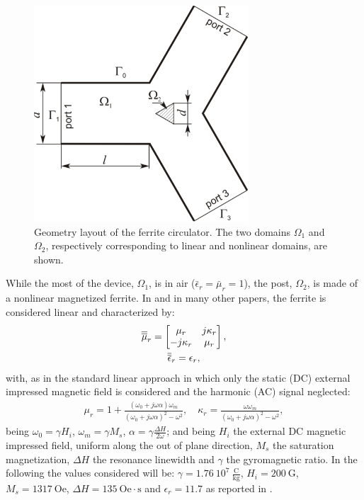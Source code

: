 \begin{figure}[!ht]
\centering
\includegraphics[width=8cm]{Koshiba}
\caption{Geometry layout of the ferrite circulator. The two domains $\Omega_1$ and $\Omega_2$, respectively corresponding to linear and nonlinear domains, are shown.}
\label{fig:Koshiba}
\end{figure}
 
While the most of the device, $\Omega_1$, is in air ($\bar{\epsilon}_r = \bar{\mu}_r = 1$), the post, $\Omega_2$, is made of a nonlinear magnetized ferrite. In \cite{koshiba1986finite} and in many other papers, the ferrite is considered linear and characterized by: 
\begin{gather}
\label{eq:ferrite}
\overline{\overline{\mu}}_r = 
\begin{bmatrix}
\mu_r& j\kappa_r\\
-j\kappa_r& \mu_r
\end{bmatrix},\\
\overline{\overline{\epsilon}}_r = \epsilon_r,
\end{gather}
%
\noindent with, as in the standard linear approach in which only the static (DC) external impressed magnetic field is considered and the harmonic (AC) signal neglected:
\begin{gather}
\label{eq:lin}
\mu_r = 1 + \frac{(\omega_0 + j\omega\alpha)\omega_m}{(\omega_0 + j\omega\alpha)^2-\omega^2}, \quad
\kappa_r = \frac{\omega\omega_m}{(\omega_0 + j\omega\alpha)^2-\omega^2},
\end{gather}
%
\noindent being $\omega_0 = \gamma H_i$, $\omega_m = \gamma M_s$, $\alpha = \gamma \frac{\Delta H}{2\omega}$; and being $H_i$ the external DC magnetic impressed field, uniform along the out of plane direction, $M_s$ the saturation magnetization,  $\Delta H$ the resonance linewidth and $\gamma$ the gyromagnetic ratio. In the following the values considered will be: $\gamma = 1.76~10^{7}~ \frac{\mathrm{C}}{\mathrm{kg}}$, $H_i = 200~\mathrm{G}$, $M_s = 1317~\mathrm{Oe}$, $\Delta H = 135~\mathrm{Oe \cdot s}$ and $\epsilon_r = 11.7$ as reported in \cite{koshiba1986finite}.

